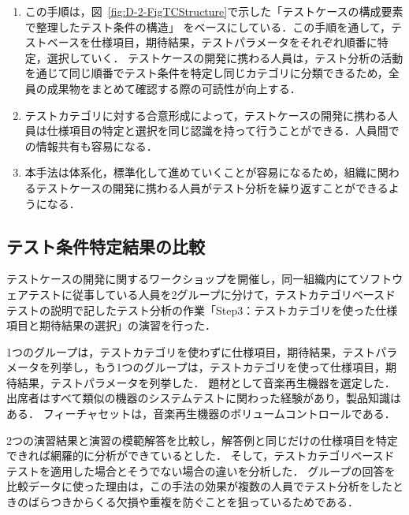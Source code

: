 \begin{enumerate}
\item この手順は，図~\ref{fig:D-2-FigTCStructure}で示した「テストケースの構成要素で整理したテスト条件の構造」
をベースにしている．この手順を通して，テストベースを仕様項目，期待結果，テストパラメータをそれぞれ順番に特定，選択していく．
テストケースの開発に携わる人員は，テスト分析の活動を通じて同じ順番でテスト条件を特定し同じカテゴリに分類できるため，全員の成果物をまとめて確認する際の可読性が向上する．
\item テストカテゴリに対する合意形成によって，テストケースの開発に携わる人員は仕様項目の特定と選択を同じ認識を持って行うことができる．人員間での情報共有も容易になる．
\item 本手法は体系化，標準化して進めていくことが容易になるため，組織に関わるテストケースの開発に携わる人員がテスト分析を繰り返すことができるようになる．
\end{enumerate}

\subsection{テスト条件特定結果の比較}

テストケースの開発に関するワークショップを開催し，同一組織内にてソフトウェアテストに従事している人員を2グループに分けて，テストカテゴリベースドテストの説明で記したテスト分析の作業「Step3：テストカテゴリを使った仕様項目と期待結果の選択」の演習を行った．

1つのグループは，テストカテゴリを使わずに仕様項目，期待結果，テストパラメータを列挙し，もう1つのグループは，テストカテゴリを使って仕様項目，期待結果，テストパラメータを列挙した．
題材として音楽再生機器を選定した．出席者はすべて類似の機器のシステムテストに関わった経験があり，製品知識はある．
フィーチャセットは，音楽再生機器のボリュームコントロールである．

2つの演習結果と演習の模範解答を比較し，解答例と同じだけの仕様項目を特定できれば網羅的に分析ができているとした．
そして，テストカテゴリベースドテストを適用した場合とそうでない場合の違いを分析した．
グループの回答を比較データに使った理由は，この手法の効果が複数の人員でテスト分析をしたときのばらつきからくる欠損や重複を防ぐことを狙っているためである．

